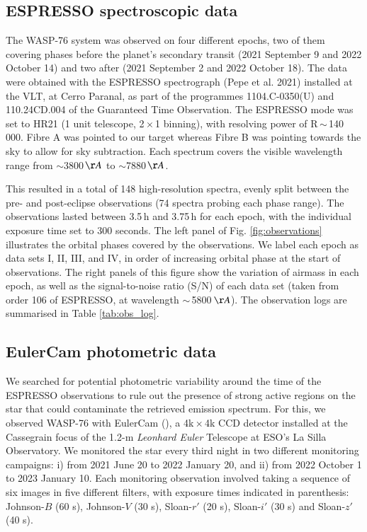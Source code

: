 \documentclass{aa}
\newcommand{\snr}{S/N}
\begin{document}
\subsection{ESPRESSO spectroscopic data}


The WASP-76 system was observed on four different epochs, two of them covering phases before the planet's secondary transit (2021 September 9 and 2022 October 14) and two after (2021 September 2 and 2022 October 18). The data were obtained with the ESPRESSO spectrograph (Pepe et al. 2021) installed at the VLT, at Cerro Paranal, as part of the programmes 1104.C-0350(U) and 110.24CD.004 of the Guaranteed Time Observation. The ESPRESSO mode was set to HR21 (1 unit telescope, 2\,$\times$\,1 binning), with resolving power of R\,$\sim$\,140\,000. Fibre A was pointed to our target whereas Fibre B was pointing towards the sky to allow for sky subtraction. Each spectrum covers the visible wavelength range from $\sim$3800\,$\AA$ to $\sim$7880\,$\AA$. 

This resulted in a total of 148 high-resolution spectra, evenly split between the pre- and post-eclipse observations (74 spectra probing each phase range). The observations lasted between 3.5$\,$h and 3.75$\,$h for each epoch, with the individual exposure time set to 300 seconds. The left panel of Fig. \ref{fig:observations} illustrates the orbital phases covered by the observations. We label each epoch as data sets I, II, III, and IV, in order of increasing orbital phase at the start of observations. The right panels of this figure show the variation of airmass in each epoch, as well as the signal-to-noise ratio (\snr) of each data set (taken from order 106 of ESPRESSO, at wavelength $\sim\,$5800$\,\AA$). The observation logs are summarised in Table \ref{tab:obs_log}. 



\subsection{EulerCam photometric data}


We searched for potential photometric variability around the time of the ESPRESSO observations to rule out the presence of strong active regions on the star that could contaminate the retrieved emission spectrum. For this, we observed WASP-76 with EulerCam (\citealp{lendl_2012}), a 4k\,$\times$\,4k CCD detector installed at the Cassegrain focus of the 1.2-m \textit{Leonhard Euler} Telescope at ESO's La Silla Observatory. We monitored the star every third night in two different monitoring campaigns: i) from 2021 June 20 to 2022 January 20, and ii) from 2022 October 1 to 2023 January 10. Each monitoring observation involved taking a sequence of six images in five different filters, with exposure times indicated in parenthesis: Johnson-$B$ (60 s), Johnson-$V$ (30 s), Sloan-$r'$ (20 s), Sloan-$i'$ (30 s) and Sloan-$z'$ (40 s).
\end{document}
